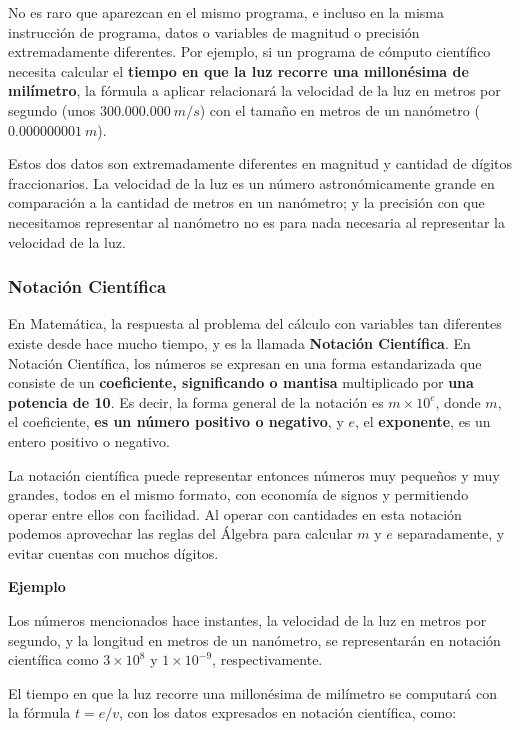 \documentclass[spanish,a4paper,]{article}
\begin{document}
No es raro que aparezcan en el mismo programa, e incluso en la misma
instrucción de programa, datos o variables de magnitud o precisión
extremadamente diferentes. Por ejemplo, si un programa de cómputo
científico necesita calcular el \textbf{tiempo en que la luz recorre una
millonésima de milímetro}, la fórmula a aplicar relacionará la velocidad
de la luz en metros por segundo (unos \(300.000.000\ m/s\)) con el
tamaño en metros de un nanómetro (\(0.000000001\ m\)).

Estos dos datos son extremadamente diferentes en magnitud y cantidad de
dígitos fraccionarios. La velocidad de la luz es un número
astronómicamente grande en comparación a la cantidad de metros en un
nanómetro; y la precisión con que necesitamos representar al nanómetro
no es para nada necesaria al representar la velocidad de la luz.

\hypertarget{notaciuxf3n-cientuxedfica}{%
\subsubsection{Notación Científica}\label{notaciuxf3n-cientuxedfica}}

En Matemática, la respuesta al problema del cálculo con variables tan
diferentes existe desde hace mucho tiempo, y es la llamada
\textbf{Notación Científica}. En Notación Científica, los números se
expresan en una forma estandarizada que consiste de un
\textbf{coeficiente, significando o mantisa} multiplicado por
\textbf{una potencia de 10}. Es decir, la forma general de la notación
es \(m \times 10^e\), donde \(m\), el coeficiente, \textbf{es un número
positivo o negativo}, y \(e\), el \textbf{exponente}, es un entero
positivo o negativo.

La notación científica puede representar entonces números muy pequeños y
muy grandes, todos en el mismo formato, con economía de signos y
permitiendo operar entre ellos con facilidad. Al operar con cantidades
en esta notación podemos aprovechar las reglas del Álgebra para calcular
\(m\) y \(e\) separadamente, y evitar cuentas con muchos dígitos.

\textbf{Ejemplo}

Los números mencionados hace instantes, la velocidad de la luz en metros
por segundo, y la longitud en metros de un nanómetro, se representarán
en notación científica como \(3\times10^8\) y \(1\times10^{-9}\),
respectivamente.

El tiempo en que la luz recorre una millonésima de milímetro se
computará con la fórmula \(t = e/v\), con los datos expresados en
notación científica, como:
\end{document}

